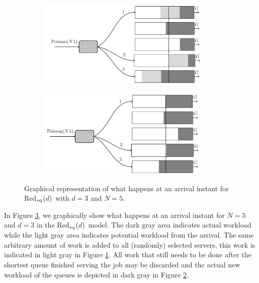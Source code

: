 \documentclass[12pt]{report}
\newcommand{\Redid}{Red$_{\textup{eq}}$($d$)}
\begin{document}
\begin{figure}[t]
	\begin{subfigure}{.3\textwidth}
		\begin{center}
		\captionsetup{width=.8\linewidth}
		\includegraphics[width=0.9\textwidth]{figures/Chapter3/redid1.JPG}
		\label{fig:redid_prentje1}
		\end{center}
	\end{subfigure}
	\begin{subfigure}{.3\textwidth}
		\begin{center}
		\captionsetup{width=.8\linewidth}
		\includegraphics[width=0.9\textwidth]{figures/Chapter3/redid2.JPG}
		\label{fig:redid_prentje2}
		\end{center}
	\end{subfigure}
	\caption{Graphical representation of what happens at an arrival instant for \Redid\ with $d=3$ and $N=5$.}
	\label{fig:redid_prentje}
\end{figure}

In Figure \ref{fig:redid_prentje}, we graphically show what happens at an arrival instant for $N=5$ and $d=3$ in the \Redid\ model. The dark gray area indicates actual workload while the light gray area indicates potential workload from the arrival. The same arbitrary amount of work is added to all (randomly) selected servers, this work is indicated in light gray in Figure \ref{fig:redid_prentje1}. All work that still needs to be done after the shortest queue finished serving the job may be discarded and the actual new workload of the queues is depicted in dark gray in Figure \ref{fig:redid_prentje2}.
\end{document}

